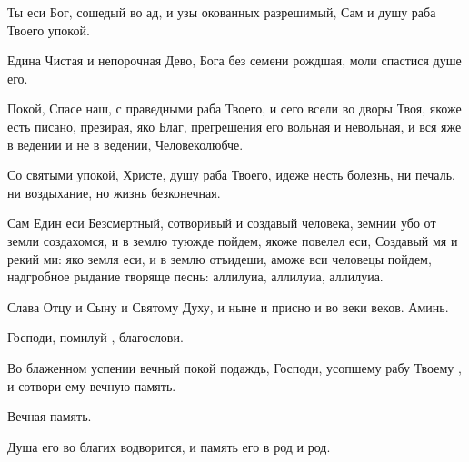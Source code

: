 \begin{mymulticols}
Ты еси Бог, сошедый во ад, и узы окованных разрешимый, Сам и душу раба Твоего упокой. 

\inynen

 Едина Чистая и непорочная Дево, Бога без семени рождшая, моли спастися душе его.


Покой, Спасе наш, с праведными раба Твоего, и сего всели во дворы Твоя, якоже есть писано, презирая, яко Благ, прегрешения его вольная и невольная, и вся яже в ведении и не в ведении, Человеколюбче. 


Со святыми упокой, Христе, душу раба Твоего, идеже несть болезнь, ни печаль, ни воздыхание, но жизнь безконечная.


Сам Един еси Безсмертный, сотворивый и создавый человека, земнии убо от земли создахомся, и в землю туюжде пойдем, якоже повелел еси, Создавый мя и рекий ми: яко земля еси, и в землю отъидеши, аможе вси человецы пойдем, надгробное рыдание творяще песнь: аллилуиа, аллилуиа, аллилуиа. 

\Chestneyshuyu 

Слава Отцу и Сыну и Святому Духу, и ныне и присно и во веки веков. Аминь. 

Господи, помилуй , благослови. 

\MolitvamiSviatyhOtecNashih

Во блаженном успении вечный покой подаждь, Господи, усопшему рабу Твоему , и сотвори ему вечную память. 

Вечная память. 

Душа его во благих водворится, и память его в род и род. 

\end{mymulticols}

\mychapterending

 

{\centering{}\par} 

